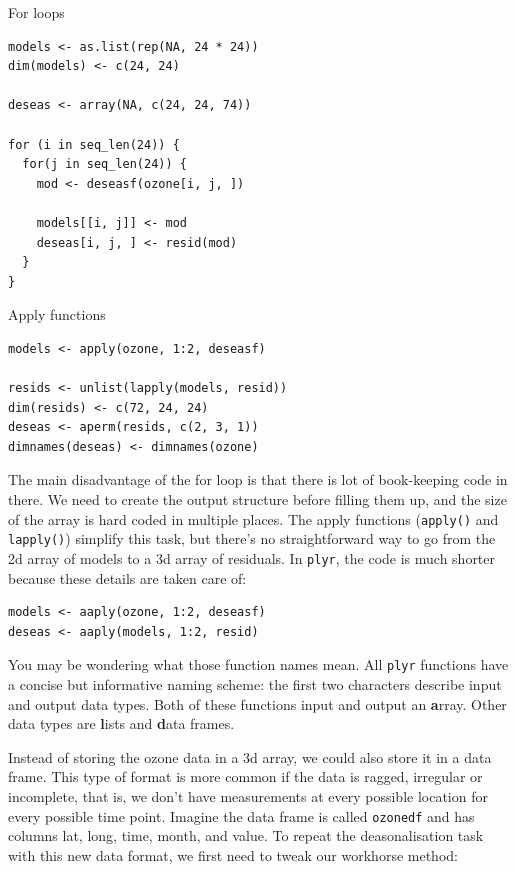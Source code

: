 \documentclass[letterpage]{scrartcl}
\newcommand{\code}[1]{\lstinline!#1!}
\newcommand{\f}[1]{\lstinline!#1()!}
\newcommand{\plyr}{{\tt plyr}\xspace}
\begin{document}
\raggedcolumns
\begin{multicols}{2}

\noindent For loops
\begin{verbatim}
models <- as.list(rep(NA, 24 * 24))
dim(models) <- c(24, 24)

deseas <- array(NA, c(24, 24, 74))

for (i in seq_len(24)) {
  for(j in seq_len(24)) {
    mod <- deseasf(ozone[i, j, ])

    models[[i, j]] <- mod
    deseas[i, j, ] <- resid(mod)
  }
}

\end{verbatim}
\columnbreak

\noindent Apply functions
\begin{verbatim}
models <- apply(ozone, 1:2, deseasf)

resids <- unlist(lapply(models, resid))
dim(resids) <- c(72, 24, 24)
deseas <- aperm(resids, c(2, 3, 1))
dimnames(deseas) <- dimnames(ozone)
\end{verbatim}
\end{multicols}

The main disadvantage of the for loop is that there is lot of book-keeping code in there.  We need to create the output structure before filling them up, and the size of the array is hard coded in multiple places.  The apply functions (\f{apply} and \f{lapply}) simplify this task, but there's no straightforward way to go from the 2d array of models to a 3d array of residuals. In \plyr, the code is much shorter because these details are taken care of:

\begin{verbatim}
models <- aaply(ozone, 1:2, deseasf)
deseas <- aaply(models, 1:2, resid)
\end{verbatim}

You may be wondering what those function names mean.  All \plyr functions have a concise but informative naming scheme: the first two characters describe input and output data types.  Both of these functions input and output an {\bf a}rray.  Other data types are {\bf l}ists and {\bf d}ata frames.

Instead of storing the ozone data in a 3d array, we could also store it in a data frame.  This type of format is more common if the data is ragged, irregular or incomplete, that is, we don't have measurements at every possible location for every possible time point.  Imagine the data frame is called \code{ozonedf} and has columns lat, long, time, month, and value.  To repeat the deasonalisation task with this new data format, we first need to tweak our workhorse method:
\end{document}
